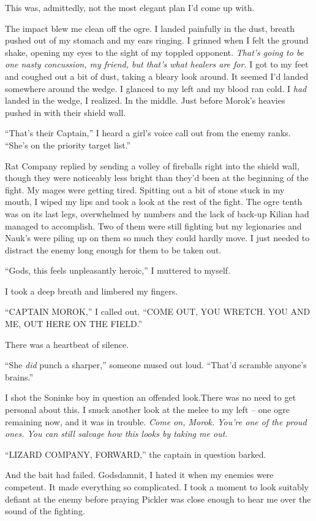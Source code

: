 \documentclass[12pt, openany]{book}
\begin{document}
This was, admittedly, not the most elegant plan I’d come up with.

The impact blew me clean off the ogre. I landed painfully in the dust, breath pushed out of my stomach and my ears ringing. I grinned when I felt the ground shake, opening my eyes to the sight of my toppled opponent. \textit{That’s going to be one nasty concussion, my friend, but that’s what healers are for.} I got to my feet and coughed out a bit of dust, taking a bleary look around. It seemed I’d landed somewhere around the wedge. I glanced to my left and my blood ran cold. I \textit{had} landed in the wedge, I realized. In the middle. Just before Morok’s heavies pushed in with their shield wall.

“That’s their Captain,” I heard a girl’s voice call out from the enemy ranks. “She’s on the priority target list.”

Rat Company replied by sending a volley of fireballs right into the shield wall, though they were noticeably less bright than they’d been at the beginning of the fight. My mages were getting tired. Spitting out a bit of stone stuck in my mouth, I wiped my lips and took a look at the rest of the fight. The ogre tenth was on its last legs, overwhelmed by numbers and the lack of back-up Kilian had managed to accomplish. Two of them were still fighting but my legionaries and Nauk’s were piling up on them so much they could hardly move. I just needed to distract the enemy long enough for them to be taken out.

“Gods, this feels unpleasantly heroic,” I muttered to myself.

I took a deep breath and limbered my fingers.

“CAPTAIN MOROK,” I called out. “COME OUT, YOU WRETCH. YOU AND ME, OUT HERE ON THE FIELD.”

There was a heartbeat of silence.

“She \textit{did }punch a sharper,” someone mused out loud. “That’d scramble anyone’s brains.”

I shot the Soninke boy in question an offended look.There was no need to get personal about this. I snuck another look at the melee to my left – one ogre remaining now, and it was in trouble. \textit{Come on, Morok. You’re one of the proud ones. You can still salvage how this looks by taking me out.}

“LIZARD COMPANY, FORWARD,” the captain in question barked.

And the bait had failed. Godsdamnit, I hated it when my enemies were competent. It made everything so complicated. I took a moment to look suitably defiant at the enemy before praying Pickler was close enough to hear me over the sound of the fighting.
\end{document}
